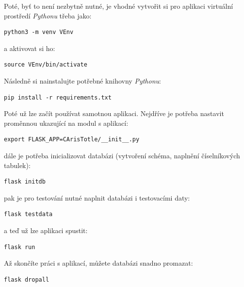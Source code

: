 \documentclass[a4paper,twoside,12pt]{scrbook}
\begin{document}
Poté, byť to není nezbytně nutné, je vhodné vytvořit si pro aplikaci virtuální prostředí \textit{Pythonu} třeba jako:
\begin{verbatim}
python3 -m venv VEnv
\end{verbatim}
a aktivovat si ho:
\begin{verbatim}
source VEnv/bin/activate
\end{verbatim}

Následně si nainstalujte potřebné knihovny \textit{Pythonu}:
\begin{verbatim}
pip install -r requirements.txt
\end{verbatim}

Poté už lze začít používat samotnou aplikaci. Nejdříve je potřeba nastavit proměnnou ukazující na modul s aplikací:
\begin{verbatim}
export FLASK_APP=CArisTotle/__init__.py
\end{verbatim}
dále je potřeba inicializovat databázi (vytvoření schéma, naplnění číselníkových tabulek):
\begin{verbatim}
flask initdb
\end{verbatim}
pak je pro testování nutné naplnit databázi i testovacími daty:
\begin{verbatim}
flask testdata
\end{verbatim}
a teď už lze aplikaci spustit:
\begin{verbatim}
flask run
\end{verbatim}

Až skončíte práci s aplikací, můžete databázi snadno promazat:
\begin{verbatim}
flask dropall
\end{verbatim}
\end{document}
